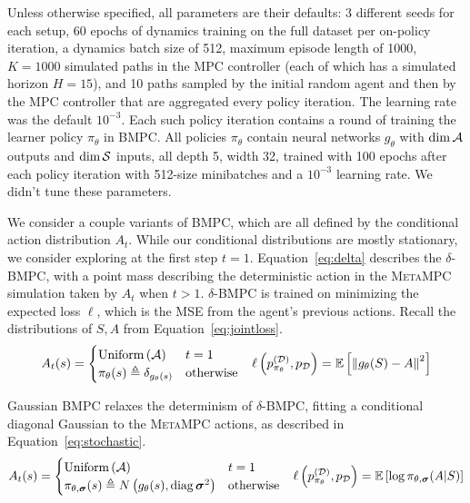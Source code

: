 \documentclass{article}
\begin{document}
Unless otherwise specified, all parameters are their defaults: 3 different seeds for each setup, 60 epochs of dynamics training on the full dataset per on-policy iteration, a dynamics batch size of 512, maximum episode length of 1000, $K=1000$ simulated paths in the MPC controller (each of which has a simulated horizon $H=15$), and 10 paths sampled by the initial random agent and then by the MPC controller that are aggregated every policy iteration. The learning rate was the default $10^{-3}$. Each such policy iteration contains a round of training the learner policy $\pi_\theta$ in \textsc{BMPC}. All policies $\pi_\theta$ contain neural networks $g_\theta$ with $\dim \mathcal{A}$ outputs and $\dim\mathcal{S}$ inputs, all depth 5, width 32, trained with 100 epochs after each policy iteration with 512-size minibatches and a $10^{-3}$ learning rate. We didn't tune these parameters.

We consider a couple variants of \textsc{BMPC}, which are all defined by the conditional action distribution $A_t$. While our conditional distributions are mostly stationary, we consider exploring at the first step $t=1$. Equation~\ref{eq:delta} describes the $\delta$-\textsc{BMPC}, with a point mass describing the deterministic action in the \textsc{MetaMPC} simulation taken by $A_t$ when $t>1$. $\delta$-\textsc{BMPC} is trained on minimizing the expected loss $\ell$, which is the MSE from the agent's previous actions. Recall the distributions of $S,A$ from Equation~\ref{eq:jointloss}.
\begin{align} \label{eq:delta}
  A_t(s)=\begin{cases}
\operatorname{Uniform}\left({\mathcal{A}}\right)    & t=1 \\
\pi_\theta(s)\triangleq\delta_{g_\theta(s)} & \text{otherwise}
  \end{cases} && \ell\left({p_{\pi_\theta}^{(\mathcal{D})},p_{\mathcal{D}}}\right)=\operatorname{\mathbb{E}}\left[{\left\lVert g_\theta(S)-A \right\rVert^2}\right]
\end{align}

Gaussian \textsc{BMPC} relaxes the determinism of $\delta$-\textsc{BMPC}, fitting a conditional diagonal Gaussian to the \textsc{MetaMPC} actions, as described in Equation~\ref{eq:stochastic}.
\begin{align} \label{eq:stochastic}
  A_t(s)=\begin{cases}
\operatorname{Uniform}\left({\mathcal{A}}\right)    & t=1 \\
\pi_{\theta,{\boldsymbol\sigma}}(s) \triangleq N\left({g_\theta(s), \operatorname{diag}{\boldsymbol\sigma}^2}\right) & \text{otherwise}
  \end{cases} && \ell\left({p_{\pi_\theta}^{(\mathcal{D})},p_{\mathcal{D}}}\right)=\operatorname{\mathbb{E}}\left[{\log \pi_{\theta,{\boldsymbol\sigma}}(A|S)}\right]
\end{align}
\end{document}
